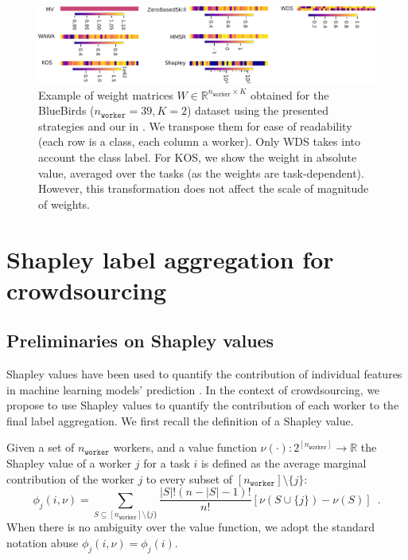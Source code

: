 \documentclass{cap2024}
\begin{document}
\begin{figure}[htbp]
  \centering
  \includegraphics[width=\textwidth]{../matrix_weights_bluebirds.pdf}
  \caption{Example of weight matrices $W\in\mathbb{R}^{n_\texttt{worker}\times K}$ obtained for the BlueBirds ($n_\texttt{worker}=39, K=2$) dataset using the presented strategies and our in . We transpose them for ease of readability (each row is a class, each column a worker). Only WDS takes into account the class label. For KOS, we show the weight in absolute value, averaged over the tasks (as the weights are task-dependent). However, this transformation does not affect the scale of magnitude of weights.}
  \label{fig:weights_by_strat}
\end{figure}

\section{Shapley label aggregation for crowdsourcing}
\label{sec:shapagg}

\subsection{Preliminaries on Shapley values}

Shapley values have been used to quantify the contribution of individual features in machine learning models' prediction \citep{molnar2020interpretable}.
In the context of crowdsourcing, we propose to use Shapley values to quantify the contribution of each worker to the final label aggregation.
We first recall the definition of a Shapley value.


\begin{definition}
Given a set of $n_\texttt{worker}$ workers, and a value function $\nu(\cdot): 2^{[n_\texttt{worker}]}\rightarrow \mathbb{R}$ the Shapley value of a worker $j$ for a task $i$ is defined as the average marginal contribution of the worker $j$ to every subset of $[n_\texttt{worker}]\setminus\{j\}$:
\begin{equation}
  \phi_j(i, \nu) = \sum_{S\subseteq [n_\texttt{worker}]\setminus\{j\}} \frac{|S|!(n-|S|-1)!}{n!} \left[\nu(S\cup\{j\}) - \nu(S)\right]\enspace.
\end{equation}
When there is no ambiguity over the value function, we adopt the standard notation abuse $\phi_j(i, \nu)=\phi_j(i)$.
\end{definition}
\end{document}

